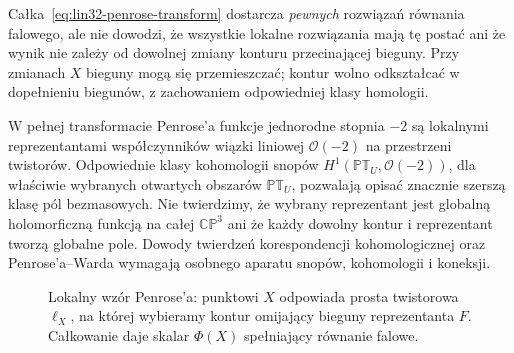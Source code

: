 \begin{uwaga}
\label{rem:lin32-penrose-kohomologia}
Całka~\eqref{eq:lin32-penrose-transform}
dostarcza \emph{pewnych} rozwiązań równania
falowego, ale nie dowodzi, że wszystkie lokalne
rozwiązania mają tę postać ani że wynik nie zależy
od dowolnej zmiany konturu przecinającej bieguny.
Przy zmianach $X$ bieguny mogą się przemieszczać;
kontur wolno odkształcać w dopełnieniu biegunów,
z zachowaniem odpowiedniej klasy homologii.

W pełnej transformacie Penrose'a
funkcje jednorodne stopnia $-2$ są lokalnymi
reprezentantami współczynników
wiązki liniowej $\mathcal O(-2)$ na przestrzeni
twistorów. Odpowiednie klasy kohomologii snopów
$H^1(\mathbb{PT}_U,\mathcal O(-2))$,
dla właściwie wybranych otwartych obszarów
$\mathbb{PT}_U$, pozwalają opisać znacznie
szerszą klasę pól bezmasowych.
Nie twierdzimy, że wybrany reprezentant
jest globalną holomorficzną funkcją
na całej $\mathbb{CP}^3$ ani że
każdy dowolny kontur i reprezentant
tworzą globalne pole.
Dowody twierdzeń korespondencji
kohomologicznej oraz Penrose'a--Warda
wymagają osobnego aparatu snopów,
kohomologii i koneksji.
\end{uwaga}

\begin{figure}[!htbp]
\centering
{}
\caption{Lokalny wzór Penrose'a:
punktowi $X$ odpowiada prosta twistorowa
$\ell_X$, na której wybieramy kontur
omijający bieguny reprezentanta $F$.
Całkowanie daje skalar $\Phi(X)$
spełniający równanie falowe.}
\label{fig:lin32-penrose-kontur}
\end{figure}

